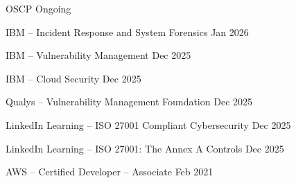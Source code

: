 


\begin{cvhonors}

  \cvhonor
    {OSCP}
    {Ongoing}

  \cvhonor
    {IBM -- Incident Response and System Forensics}
    {Jan 2026}

  \cvhonor
    {IBM -- Vulnerability Management}
    {Dec 2025}

  \cvhonor
    {IBM -- Cloud Security}
    {Dec 2025}

  \cvhonor
    {Qualys -- Vulnerability Management Foundation}
    {Dec 2025}

  \cvhonor
    {LinkedIn Learning -- ISO 27001 Compliant Cybersecurity}
    {Dec 2025}

  \cvhonor
    {LinkedIn Learning -- ISO 27001: The Annex A Controls}
    {Dec 2025}

  \cvhonor
    {AWS -- Certified Developer – Associate}
    {Feb 2021}

\end{cvhonors}



  



